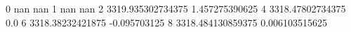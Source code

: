 0 nan nan
1 nan nan
2 3319.935302734375 1.457275390625
4 3318.47802734375 0.0
6 3318.38232421875 -0.095703125
8 3318.484130859375 0.006103515625
